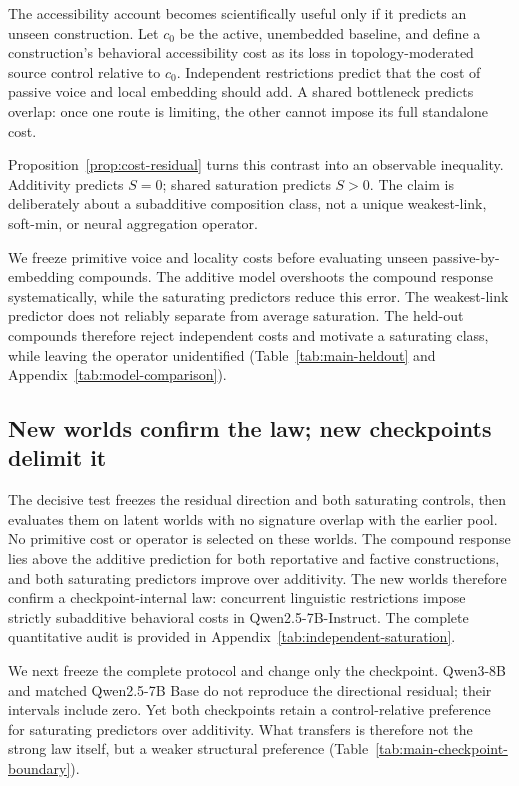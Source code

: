The accessibility account becomes scientifically useful only if it predicts an
unseen construction. Let $c_0$ be the active, unembedded baseline, and define a
construction's behavioral accessibility cost as its loss in topology-moderated
source control relative to $c_0$. Independent restrictions predict that the
cost of passive voice and local embedding should add. A shared bottleneck
predicts overlap: once one route is limiting, the other cannot impose its full
standalone cost.



Proposition~\ref{prop:cost-residual} turns this contrast into an observable
inequality. Additivity predicts $S=0$; shared saturation predicts $S>0$. The
claim is deliberately about a subadditive composition class, not a unique
weakest-link, soft-min, or neural aggregation operator.

We freeze primitive voice and locality costs before evaluating unseen
passive-by-embedding compounds. The additive model overshoots the compound
response systematically, while the saturating predictors reduce this error.
The weakest-link predictor does not reliably separate from average saturation.
The held-out compounds therefore reject independent costs and motivate a
saturating class, while leaving the operator unidentified
(Table~\ref{tab:main-heldout} and Appendix~\ref{tab:model-comparison}).



\subsection{New worlds confirm the law; new checkpoints delimit it}

The decisive test freezes the residual direction and both saturating controls,
then evaluates them on latent worlds with no signature overlap with the earlier
pool. No primitive cost or operator is selected on these worlds. The compound
response lies above the additive prediction for both reportative and factive
constructions, and both saturating predictors improve over additivity. The new
worlds therefore confirm a checkpoint-internal law: concurrent linguistic
restrictions impose strictly subadditive behavioral costs in
Qwen2.5-7B-Instruct. The complete quantitative audit is provided in
Appendix~\ref{tab:independent-saturation}.

We next freeze the complete protocol and change only the checkpoint. Qwen3-8B
and matched Qwen2.5-7B Base do not reproduce the directional residual; their
intervals include zero. Yet both checkpoints retain a control-relative
preference for saturating predictors over additivity. What transfers is
therefore not the strong law itself, but a weaker structural preference
 (Table~\ref{tab:main-checkpoint-boundary}).

